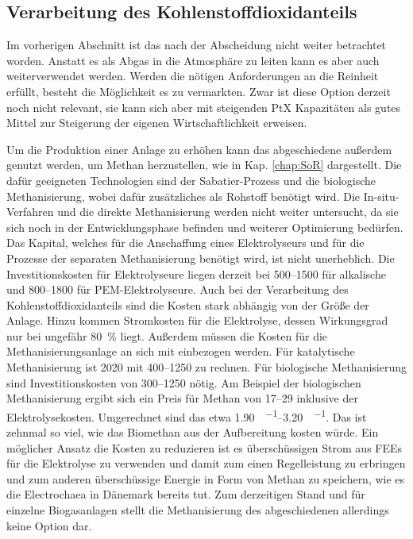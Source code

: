 \subsection{Verarbeitung des Kohlenstoffdioxidanteils}

Im vorherigen Abschnitt ist das  nach der Abscheidung nicht weiter betrachtet worden. Anstatt es als Abgas in die Atmosphäre zu leiten kann es aber auch weiterverwendet werden. Werden die nötigen Anforderungen an die Reinheit erfüllt, besteht die Möglichkeit es zu vermarkten. Zwar ist diese Option derzeit noch nicht relevant, sie kann sich aber mit steigenden PtX Kapazitäten als gutes Mittel zur Steigerung der eigenen Wirtschaftlichkeit erweisen. \parencite{UmBA19} \smallskip

Um die Produktion einer Anlage zu erhöhen kann das abgeschiedene  außerdem genutzt werden, um Methan herzustellen, wie in Kap. \ref{chap:SoR} dargestellt. Die dafür geeigneten Technologien sind der Sabatier-Prozess und die biologische Methanisierung, wobei dafür zusätzliches  als Rohstoff benötigt wird. Die In-situ-Verfahren und die direkte Methanisierung werden nicht weiter untersucht, da sie sich noch in der Entwicklungsphase befinden und weiterer Optimierung bedürfen. Das Kapital, welches für die Anschaffung eines Elektrolyseurs und für die Prozesse der separaten Methanisierung benötigt wird, ist nicht unerheblich. Die Investitionskosten für Elektrolyseure liegen derzeit bei \SIrange{500}{1500}{\Eurkw} für alkalische und \SIrange{800}{1800}{\Eurkw} für PEM-Elektrolyseure. Auch bei der Verarbeitung des Kohlenstoffdioxidanteils sind die Kosten stark abhängig von der Größe der Anlage. Hinzu kommen Stromkosten für die Elektrolyse, dessen Wirkungsgrad nur bei ungefähr \SI{80}{\percent} liegt. Außerdem müssen die Kosten für die Methanisierungsanlage an sich mit einbezogen werden. Für katalytische Methanisierung ist \SI{2020}{\relax} mit \SIrange{400}{1250}{\Eurkw} zu rechnen. Für biologische Methanisierung sind Investitionskosten von \SIrange{300}{1250}{\Eurkw} nötig. Am Beispiel der biologischen Methanisierung ergibt sich ein Preis für Methan von \SIrange{17}{29}{\ctkwh} inklusive der Elektrolysekosten. Umgerechnet sind das etwa \SIrange{1,90}{3,20}{\sieuro\per\normvol}. Das ist zehnmal so viel, wie das Biomethan aus der Aufbereitung kosten würde. Ein möglicher Ansatz die Kosten zu reduzieren ist es überschüssigen Strom aus \glspl{FEE} für die Elektrolyse zu verwenden und damit zum einen Regelleistung zu erbringen und zum anderen überschüssige Energie in Form von Methan zu speichern, wie es die Electrochaea in Dänemark bereits tut. Zum derzeitigen Stand und für einzelne Biogasanlagen stellt die Methanisierung des abgeschiedenen  allerdings keine Option dar. \parencite{Chaea20} \parencite{4.2b17} \parencite{dena2018b}


